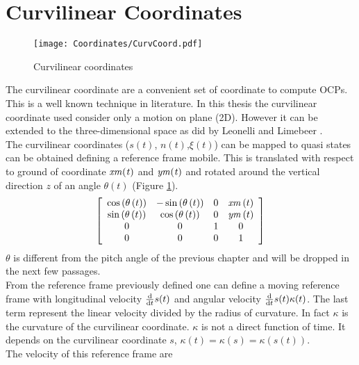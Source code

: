 \section{Curvilinear Coordinates}
%
\begin{figure}[htb]
    \centering
    \texttt{[image: Coordinates/CurvCoord.pdf]}
    \caption{Curvilinear coordinates}
    \label{fig:CurvCoord}
\end{figure}
%
The curvilinear coordinate are a convenient set of coordinate to compute OCPs. This is a well known technique in literature. In this thesis the curvilinear coordinate used consider only a motion on plane (2D). However it can be extended to the three-dimensional space as did by Leonelli and Limebeer \cite{leonelli2019optimal}.\\
%
The curvilinear coordinates ($s(t)$, $n(t)$,$\xi(t)$) can be mapped to quasi states can be obtained defining a reference frame mobile. This is translated with respect to ground of coordinate $\it xm(t)$ and $\it ym(t)$ and rotated around the vertical direction $z$ of an angle $\theta(t)$ (Figure \ref{fig:CurvCoord}).
%
\begin{equation}
\left[ \begin{array}{cccc} 
    \cos \left( \theta \left( t \right) \right) &-\sin \left( \theta \left( t \right)  \right) &0&{\it xm}\left( t \right) \\ 
    \sin \left( \theta \left( t\right)  \right) &\cos \left( \theta \left( t \right)  \right) &0&{\it ym} \left( t \right) \\ 
    0&0&1&0\\ 
    0&0&0&1
\end{array} \right]    
\end{equation}
%
$\theta$ is different from the pitch angle of the previous chapter and will be dropped in the next few passages.\\
From the reference frame previously defined one can define a moving reference frame with longitudinal velocity $\frac {\rm d}{{\rm d}t} s(t)$ and angular velocity $\frac {\rm d}{{\rm d}t} s(t) \kappa(t)$. The last term represent the linear velocity divided by the radius of curvature. In fact $\kappa$ is the curvature of the curvilinear coordinate. $\kappa$ is not a direct function of time. It depends on the curvilinear coordinate $s$, $\kappa(t)=\kappa(s)=\kappa(s(t))$.\\
The velocity of this reference frame are
%
